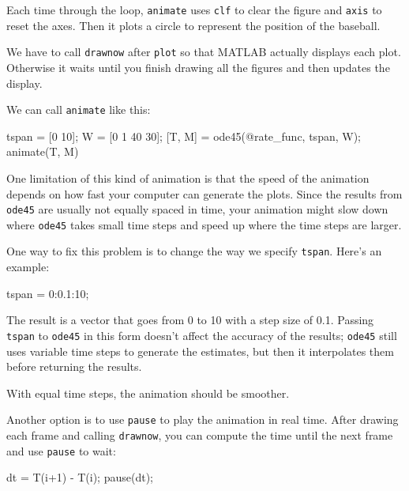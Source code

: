 
Each time through the loop, \lstinline{animate} uses \lstinline{clf}
to clear the figure and \lstinline{axis} to reset the axes.  Then it plots a circle to represent the position of the \mbox{baseball}.


We have to call \lstinline{drawnow} after \lstinline{plot} so
that MATLAB actually displays each plot.  Otherwise it waits
until you finish drawing all the figures and then updates
the display.

We can call \lstinline{animate} like this:

\begin{code}
    tspan = [0 10];
    W = [0 1 40 30];
    [T, M] = ode45(@rate_func, tspan, W);
    animate(T, M)
\end{code}

One limitation of this kind of animation is that the speed
of the animation depends on how fast your computer can generate
the plots.  Since the results from \lstinline{ode45} are usually not
equally spaced in time, your animation might slow down where
\lstinline{ode45} takes small time steps and speed up where the time
steps are larger.


One way to fix this problem is to change the way we specify \lstinline{tspan}.
Here's an example:

\begin{code}
    tspan = 0:0.1:10;
\end{code}

The result is a vector that goes from 0 to 10 with a step size of 0.1.
Passing \lstinline{tspan} to \lstinline{ode45} in this form doesn't affect the accuracy of the results;
\lstinline{ode45} still uses variable time steps to generate the estimates, but then it interpolates them before returning the results.


With equal time steps, the animation should be smoother.

Another option is to use \lstinline{pause} to play the animation in
real time.  After drawing each frame and calling
\lstinline{drawnow}, you can compute the time
until the next frame and use \lstinline{pause} to wait:

\begin{code}
    dt = T(i+1) - T(i);
    pause(dt);
\end{code}

